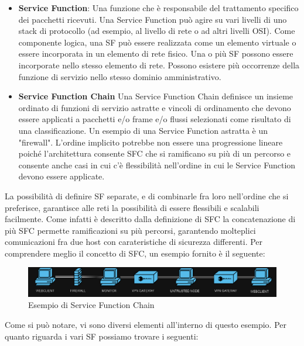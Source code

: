 \begin{itemize}
    \item \textbf{Service Function}: Una funzione che è responsabile del trattamento specifico dei pacchetti ricevuti. Una Service Function può agire su vari livelli di uno stack di protocollo (ad esempio, al livello di rete o ad altri livelli OSI). 
    Come componente logica, una SF può essere realizzata come un elemento virtuale o essere incorporata in un elemento di rete fisico.
     Una o più SF possono essere incorporate nello stesso elemento di rete. Possono esistere più occorrenze della funzione di servizio nello stesso dominio amministrativo.
    \item \textbf{Service Function Chain} Una Service Function Chain definisce un insieme ordinato di funzioni di servizio astratte e vincoli di ordinamento che devono essere applicati a pacchetti e/o frame e/o flussi selezionati come risultato di una classificazione. 
    Un esempio di una Service Function astratta è un "firewall". 
    L'ordine implicito potrebbe non essere una progressione lineare poiché l'architettura consente SFC che si ramificano su più di un percorso e consente anche casi in cui c'è flessibilità nell'ordine in cui le Service Function devono essere applicate. 
\end{itemize}

La possibilità di definire SF separate, e di combinarle fra loro nell'ordine che si preferisce, garantisce alle reti la possibilità di essere flessibili e scalabili facilmente.
Come infatti è descritto dalla definizione di SFC la concatenazione di più SFC permette ramificazioni su più percorsi, garantendo molteplici comunicazioni fra due host con carateristiche di sicurezza differenti.
Per comprendere meglio il concetto di SFC, un esempio fornito è il seguente:


\begin{figure}[h]  %
    \centering
    \includegraphics[width=1\textwidth]{SFC.png}  %
    \caption{Esempio di Service Function Chain}
    \label{fig:esempio}
  \end{figure}


Come si può notare, vi sono diversi elementi all'interno di questo esempio.
Per quanto riguarda i vari SF possiamo trovare i seguenti:

